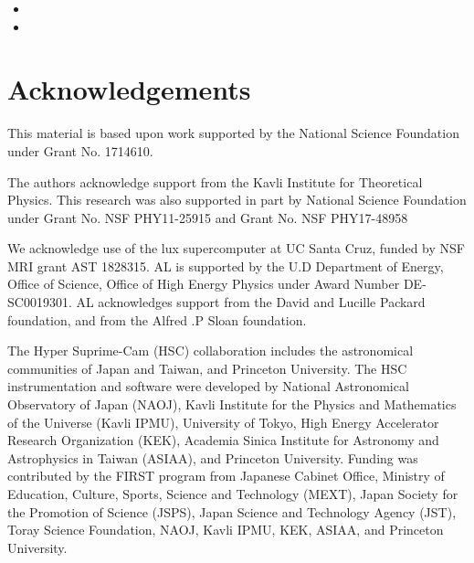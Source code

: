 \documentclass[a4paper,fleqn,usenatbib]{mnras}
\begin{document}
\begin{itemize}
        \item {}

        \item {}

    \end{itemize}



\section*{Acknowledgements}


  This material is based upon work supported by the National Science Foundation under 
  Grant No. 1714610. 
  
  The authors acknowledge support from the Kavli Institute for Theoretical Physics.
  This research was also supported in part by National Science Foundation under Grant 
  No. NSF PHY11-25915 and Grant No. NSF PHY17-48958
  
  We acknowledge use of the lux supercomputer at UC Santa Cruz, funded by NSF MRI grant AST
  1828315. AL is supported by the U.D Department of Energy, Office of Science, Office of High
  Energy Physics under Award Number DE-SC0019301. AL acknowledges support from the David and
  Lucille Packard foundation, and from the Alfred .P Sloan foundation.

  The Hyper Suprime-Cam (HSC) collaboration includes the astronomical communities of 
  Japan and Taiwan, and Princeton University.  The HSC instrumentation and software were
  developed by National Astronomical Observatory of Japan (NAOJ), Kavli Institute
  for the Physics and Mathematics of the Universe (Kavli IPMU), University of Tokyo,
  High Energy Accelerator Research Organization (KEK), Academia Sinica Institute
  for Astronomy and Astrophysics in Taiwan (ASIAA), and Princeton University.  
  Funding was contributed by the FIRST program from Japanese Cabinet Office,  Ministry 
  of Education, Culture, Sports, Science and Technology (MEXT), Japan Society for 
  the Promotion of Science (JSPS), Japan Science and Technology Agency (JST), Toray 
  Science Foundation, NAOJ, Kavli IPMU, KEK, ASIAA, and Princeton University.
   
\end{document}
